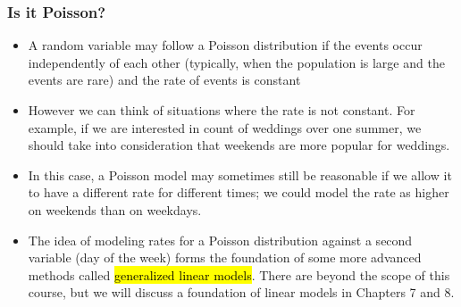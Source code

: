 \documentclass[t,compress,mathserif]{beamer}
\begin{document}
\begin{frame}
\frametitle{Is it Poisson?}
\begin{small}
\begin{itemize}

\item A random variable may follow a Poisson distribution if the events occur independently of each other (typically, when the population is large and the events are rare) and the rate of events is constant

\item However we can think of situations where the rate is not constant. For example, if we are interested in count of weddings over one summer, we should take into consideration that weekends are more popular for weddings.

\item In this case, a Poisson model may sometimes still be reasonable if we allow it to have a different rate for different times; we could model the rate as higher on weekends than on weekdays.

\item The idea of modeling rates for a Poisson distribution against a second variable (day of the week) forms the
foundation of some more advanced methods called \hl{generalized linear models}. There are beyond the scope of this course, but we will discuss a foundation of linear models in Chapters 7 and 8.

\end{itemize}
\end{small}

\end{frame}

\end{document}
